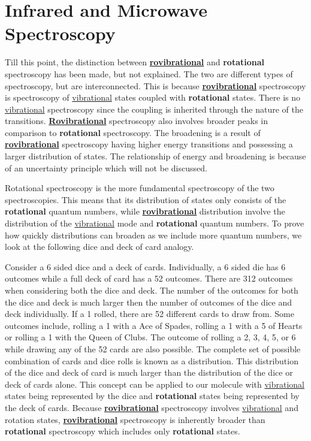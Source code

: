 \documentclass[11pt,a4paper]{book}
\begin{document}
	\section{Infrared and Microwave Spectroscopy}
		\label{sec:Infrared and Microwave Spectroscopy}
		Till this point, the distinction between \underline{\textbf{rovibrational}} and \textbf{rotational} spectroscopy has been made, but not explained. The two are different types of spectroscopy, but are interconnected. This is because \underline{\textbf{rovibrational}} spectroscopy is spectroscopy of \underline{vibrational} states coupled with \textbf{rotational} states. There is no \underline{vibrational} spectroscopy since the coupling is inherited through the nature of the transitions. \underline{\textbf{Rovibrational}} spectroscopy also involves broader peaks in comparison to \textbf{rotational} spectroscopy. The broadening is a result of \underline{\textbf{rovibrational}} spectroscopy having higher energy transitions and possessing a larger distribution of states. The relationship of energy and broadening is because of an uncertainty principle which will not be discussed.
		
		Rotational spectroscopy is the more fundamental spectroscopy of the two spectroscopies. This means that its distribution of states only consists of the \textbf{rotational} quantum numbers, while \underline{\textbf{rovibrational}} distribution involve the distribution of the \underline{vibrational} mode and \textbf{rotational} quantum numbers. To prove how quickly distributions can broaden as we include more quantum numbers, we look at the following dice and deck of card analogy. 
		
		Consider a 6 sided dice and a deck of cards. Individually, a 6 sided die has 6 outcomes while a full deck of card has a 52 outcomes. There are 312 outcomes when considering both the dice and deck. The number of the outcomes for both the dice and deck is much larger then the number of outcomes of the dice and deck individually. If a 1 rolled, there are 52 different cards to draw from. Some outcomes include, rolling a 1 with a Ace of Spades, rolling a 1 with a 5 of Hearts or rolling a 1 with the Queen of Clubs. The outcome of rolling a 2, 3, 4, 5, or 6 while drawing any of the 52 cards are also possible. The complete set of possible combination of cards and dice rolls is known as a distribution. This distribution of the dice and deck of card is much larger than the distribution of the dice or deck of cards alone. This concept can be applied to our molecule with \underline{vibrational} states being represented by the dice and \textbf{rotational} states being represented by the deck of cards. Because \underline{\textbf{rovibrational}} spectroscopy involves \underline{vibrational} and rotation states, \underline{\textbf{rovibrational}} spectroscopy is inherently broader than \textbf{rotational} spectroscopy which includes only \textbf{rotational} states.
		
\end{document}
